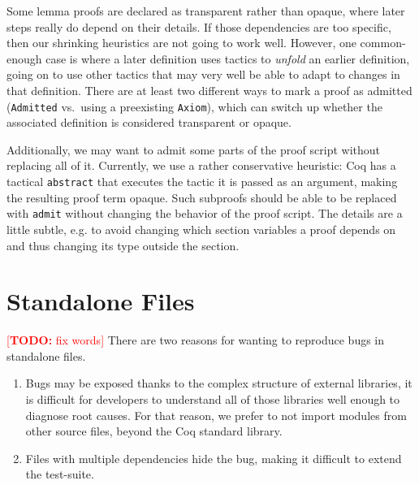 \documentclass[a4paper,USenglish,cleveref,autoref,thm-restate]{lipics-v2021}
\makeatletter
\newcommand{\todo}[1]{%
\@latex@warning{TODO: \detokenize{#1} on page \thepage}%
\textcolor{red}{[\textbf{TODO:} #1]}}%
\makeatother
\begin{document}
Some lemma proofs are declared as transparent rather than opaque, where later steps really do depend on their details.
If those dependencies are too specific, then our shrinking heuristics are not going to work well.
However, one common-enough case is where a later definition uses tactics to \emph{unfold} an earlier definition, going on to use other tactics that may very well be able to adapt to changes in that definition.
There are at least two different ways to mark a proof as admitted (\texttt{Admitted} vs.\ using a preexisting \texttt{Axiom}), which can switch up whether the associated definition is considered transparent or opaque.

Additionally, we may want to admit some parts of the proof script without replacing all of it.
Currently, we use a rather conservative heuristic:
Coq has a tactical \verb|abstract| that executes the tactic it is passed as an argument, making the resulting proof term opaque.
Such subproofs should be able to be replaced with \verb|admit| without changing the behavior of the proof script.
The details are a little subtle, e.g. to avoid changing which section variables a proof depends on and thus changing its type outside the section.

\label{text:ltac-fragment:orig}

\section{Standalone Files}\label{sec:standalone}

 
\todo{fix words}
There are two reasons for wanting to reproduce bugs in standalone files. 
\begin{enumerate}
\item Bugs may be exposed thanks to the complex structure of external libraries, it is difficult for developers to understand all of those libraries well enough to diagnose root causes.
For that reason, we prefer to not import modules from other source files, beyond the Coq standard library.
\item Files with multiple dependencies hide the bug, making it difficult to extend the test-suite.

\end{enumerate}
\end{document}
